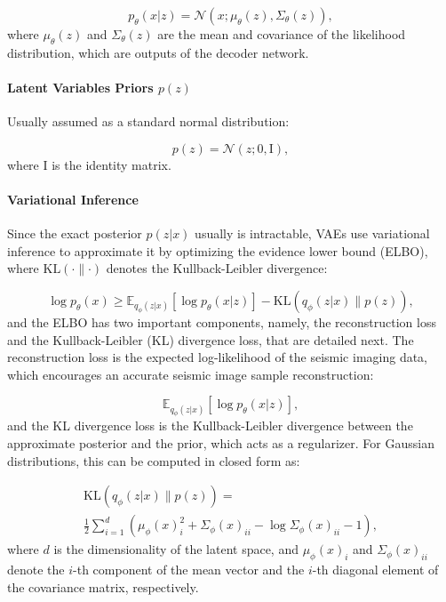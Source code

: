 \documentclass{ieeeaccess}
\begin{document}
\begin{equation}
p_\theta(x | z) = \mathcal{N}(x; \mu_\theta(z), \Sigma_\theta(z)),
\end{equation}
where $\mu_\theta(z)$ and $\Sigma_\theta(z)$ are the mean and covariance of the likelihood distribution, which are outputs of the decoder network.

\paragraph{Latent Variables Priors $p(z)$}
Usually assumed as a standard normal distribution:

\begin{equation}
p(z) = \mathcal{N}(z; 0, \mathrm{I}),
\end{equation}
where $\mathrm{I}$ is the identity matrix.

\paragraph{Variational Inference} 
Since the exact posterior $p(z | x)$ usually is intractable, VAEs use variational inference to approximate it by optimizing the evidence lower bound (ELBO), where $\text{KL}(\cdot \parallel \cdot)$ denotes the Kullback-Leibler divergence:

\begin{equation}
\log p_\theta(x) \geq \mathbb{E}_{q_\phi(z | x)} \left[ \log p_\theta(x | z) \right] - \text{KL}(q_\phi(z | x) \parallel p(z)),
\end{equation}
and the ELBO has two important components, namely, the reconstruction loss and the Kullback-Leibler (KL) divergence loss, that are detailed next. The reconstruction loss is the expected log-likelihood of the seismic imaging data, which encourages an accurate seismic image sample reconstruction:

\begin{equation}
\mathbb{E}_{q_\phi(z | x)} \left[ \log p_\theta(x | z) \right],
\end{equation}
and the KL divergence loss is the Kullback-Leibler divergence between the approximate posterior and the prior, which acts as a regularizer. For Gaussian distributions, this can be computed in closed form as:

\begin{equation}
\begin{aligned}
\text{KL}(q_\phi(z | x) \parallel p(z))
=  \\
\frac{1}{2} \sum_{i=1}^{d} \left( \mu_\phi(x)_i^2 + \Sigma_\phi(x)_{ii} - \log \Sigma_\phi(x)_{ii} - 1 \right),
\end{aligned}
\end{equation}
where $d$ is the dimensionality of the latent space, and $\mu_\phi(x)_i$ and $\Sigma_\phi(x)_{ii}$ denote the $i$-th component of the mean vector and the $i$-th diagonal element of the covariance matrix, respectively.
\end{document}
